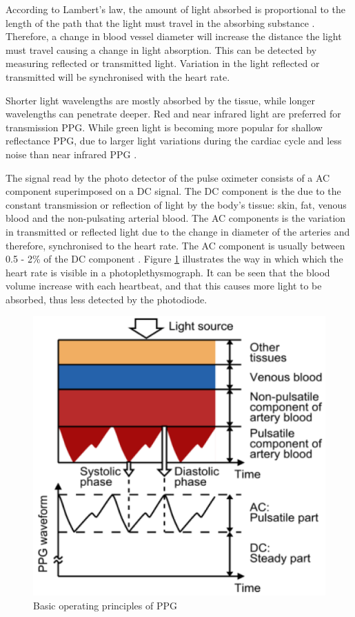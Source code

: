 \medskip
According to Lambert's law, the amount of light absorbed is proportional to the length of the path that the light must travel in the absorbing substance \citep{lambertANDbeer}. Therefore, a change in blood vessel diameter will increase the distance the light must travel causing a change in light absorption. This can be detected by measuring reflected or transmitted light. Variation in the light reflected or transmitted will be synchronised with the heart rate.

\medskip
Shorter light wavelengths are mostly absorbed by the tissue, while longer wavelengths can penetrate deeper. Red and near infrared light are preferred for transmission PPG. While green light is becoming more popular for shallow reflectance PPG, due to larger light variations during the cardiac cycle and less noise than near infrared PPG \citep{tamura2014wearable}.

\medskip

The signal read by the photo detector of the pulse oximeter consists of a AC component superimposed on a DC signal. The DC component is the due to the constant transmission or reflection of light by the body's tissue: skin, fat, venous blood and the non-pulsating arterial blood. The AC components is the variation in transmitted or reflected light due to the change in diameter of the arteries and therefore, synchronised to the heart rate. The AC component is usually between 0.5 - 2\% of the DC component \citep{tavakoli2006analog}. Figure \ref{fig:PPG} illustrates the way in which which the heart rate is visible in a photoplethysmograph. It can be seen that the blood volume increase with each heartbeat, and that this causes more light to be absorbed, thus less detected by the photodiode.

\medskip

\begin{figure}[h]
   \centering
   \includegraphics[scale=1.6]{figs/PPG}
   \caption{Basic operating principles of PPG \citep{tamura2014wearable}}
   \label{fig:PPG}
\end{figure}

